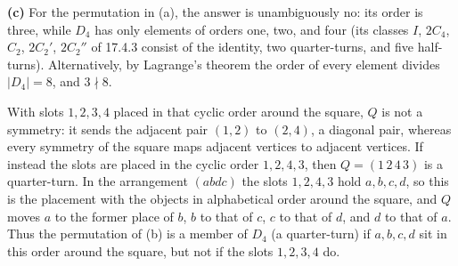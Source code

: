 \textbf{(c)} For the permutation in (a), the answer is unambiguously
$\boxed{\text{no}}$: its order is three, while $D_4$ has only
elements of orders one, two, and four (its classes $I$, $2C_4$,
$C_2$, $2C_2'$, $2C_2''$ of 17.4.3 consist of the identity, two
quarter-turns, and five half-turns). Alternatively, by Lagrange's
theorem the order of every element divides $|D_4|=8$, and $3\nmid8$.

With slots $1,2,3,4$ placed in that cyclic order around the square,
$Q$ is not a symmetry: it sends the adjacent pair $(1,2)$ to
$(2,4)$, a diagonal pair, whereas every symmetry of the square maps
adjacent vertices to adjacent vertices. If instead the slots are
placed in the cyclic order $1,2,4,3$, then $Q=(1\,2\,4\,3)$ is a
quarter-turn. In the arrangement $(abdc)$ the slots $1,2,4,3$ hold
$a,b,c,d$, so this is the placement with the objects in alphabetical
order around the square, and $Q$ moves $a$ to the former place of
$b$, $b$ to that of $c$, $c$ to that of $d$, and $d$ to that of $a$.
Thus the permutation of (b) is a member of $D_4$ (a quarter-turn) if
$a,b,c,d$ sit in this order around the square, but not if the
slots $1,2,3,4$ do.

